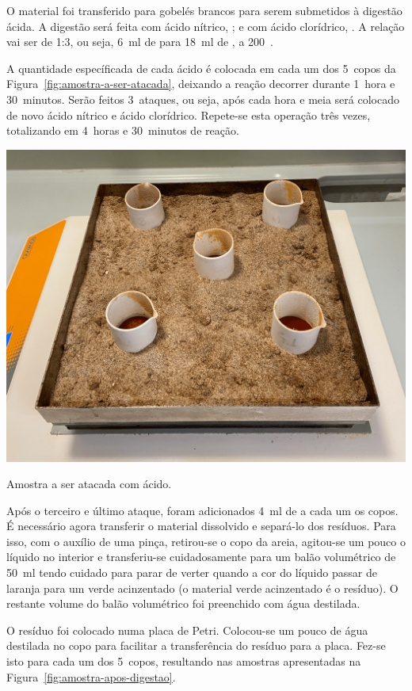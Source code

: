 O material foi transferido para gobelés brancos para serem submetidos à digestão ácida.
A digestão será feita com ácido nítrico, ; e com ácido clorídrico, .
A relação vai ser de 1:3, ou seja, 6~ml de  para 18~ml de , a 200~\graus.

A quantidade específicada de cada ácido é colocada em cada um dos 5~copos da Figura~\ref{fig:amostra-a-ser-atacada}, deixando a reação decorrer durante 1~hora e 30~minutos.
Serão feitos 3~ataques, ou seja, após cada hora e meia será colocado de novo ácido nítrico e ácido clorídrico.
Repete-se esta operação três vezes, totalizando em 4~horas e 30~minutos de reação.
\begin{marginfigure}[-1\baselineskip]
    \centering
    \includegraphics[width=0.9\linewidth]{figures/Amostra a ser atacada - digestão ácida}
    \caption{Amostra a ser atacada com ácido.}
    \label{fig:amostra-a-ser-atacada}
\end{marginfigure}

Após o terceiro e último ataque, foram adicionados 4~ml de  a cada um os copos.
É necessário agora transferir o material dissolvido e separá-lo dos resíduos.
Para isso, com o auxílio de uma pinça, retirou-se o copo da areia, agitou-se um pouco o líquido no interior e transferiu-se cuidadosamente para um balão volumétrico de 50~ml tendo cuidado para parar de verter quando a cor do líquido passar de laranja para um verde acinzentado (o material verde acinzentado é o resíduo).
O restante volume do balão volumétrico foi preenchido com água destilada.

O resíduo foi colocado numa placa de Petri.
Colocou-se um pouco de água destilada no copo para facilitar a transferência do resíduo para a placa.
Fez-se isto para cada um dos 5~copos, resultando nas amostras apresentadas na Figura~\ref{fig:amostra-apos-digestao}.

